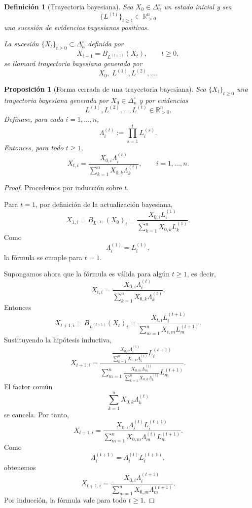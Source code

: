 \documentclass[12pt]{article}
\newtheorem{definicion}{Definición}[section]
\newtheorem{proposicion}{Proposición}[section]
\begin{document}
\begin{definicion}[Trayectoria bayesiana]
Sea \(X_0\in\Delta_n^\circ\) un estado inicial y sea
\[
\{L^{(t)}\}_{t\geq 1}\subset \mathbb{R}_{>0}^{n}
\]
una sucesión de evidencias bayesianas positivas.

La sucesión \(\{X_t\}_{t\geq 0}\subset\Delta_n^\circ\) definida por
\[
X_{t+1}
=
B_{L^{(t+1)}}(X_t),
\qquad t\geq 0,
\]
se llamará \emph{trayectoria bayesiana generada por}
\[
X_0,\; L^{(1)},L^{(2)},\dots.
\]
\end{definicion}

\begin{proposicion}[Forma cerrada de una trayectoria bayesiana]
Sea \(\{X_t\}_{t\geq 0}\) una trayectoria bayesiana generada por
\(X_0\in\Delta_n^\circ\) y por evidencias
\[
L^{(1)},L^{(2)},\dots,L^{(t)}
\in\mathbb{R}_{>0}^{n}.
\]
Defínase, para cada \(i=1,\dots,n\),
\[
\Lambda_i^{(t)}
:=
\prod_{s=1}^{t}L_i^{(s)}.
\]
Entonces, para todo \(t\geq 1\),
\[
X_{t,i}
=
\frac{
X_{0,i}\Lambda_i^{(t)}
}{
\sum_{k=1}^{n}X_{0,k}\Lambda_k^{(t)}
},
\qquad i=1,\dots,n.
\]
\end{proposicion}

\begin{proof}
Procedemos por inducción sobre \(t\).

Para \(t=1\), por definición de la actualización bayesiana,
\[
X_{1,i}
=
B_{L^{(1)}}(X_0)_i
=
\frac{X_{0,i}L_i^{(1)}}{\sum_{k=1}^{n}X_{0,k}L_k^{(1)}}.
\]
Como
\[
\Lambda_i^{(1)}=L_i^{(1)},
\]
la fórmula se cumple para \(t=1\).

Supongamos ahora que la fórmula es válida para algún \(t\geq 1\), es decir,
\[
X_{t,i}
=
\frac{
X_{0,i}\Lambda_i^{(t)}
}{
\sum_{k=1}^{n}X_{0,k}\Lambda_k^{(t)}
}.
\]
Entonces
\[
X_{t+1,i}
=
B_{L^{(t+1)}}(X_t)_i
=
\frac{X_{t,i}L_i^{(t+1)}}{\sum_{m=1}^{n}X_{t,m}L_m^{(t+1)}}.
\]
Sustituyendo la hipótesis inductiva,
\[
X_{t+1,i}
=
\frac{
\frac{X_{0,i}\Lambda_i^{(t)}}{\sum_{k=1}^{n}X_{0,k}\Lambda_k^{(t)}}
L_i^{(t+1)}
}{
\sum_{m=1}^{n}
\frac{X_{0,m}\Lambda_m^{(t)}}{\sum_{k=1}^{n}X_{0,k}\Lambda_k^{(t)}}
L_m^{(t+1)}
}.
\]
El factor común
\[
\sum_{k=1}^{n}X_{0,k}\Lambda_k^{(t)}
\]
se cancela. Por tanto,
\[
X_{t+1,i}
=
\frac{
X_{0,i}\Lambda_i^{(t)}L_i^{(t+1)}
}{
\sum_{m=1}^{n}
X_{0,m}\Lambda_m^{(t)}L_m^{(t+1)}
}.
\]
Como
\[
\Lambda_i^{(t+1)}
=
\Lambda_i^{(t)}L_i^{(t+1)},
\]
obtenemos
\[
X_{t+1,i}
=
\frac{
X_{0,i}\Lambda_i^{(t+1)}
}{
\sum_{m=1}^{n}X_{0,m}\Lambda_m^{(t+1)}
}.
\]
Por inducción, la fórmula vale para todo \(t\geq 1\).
\end{proof}
\end{document}

